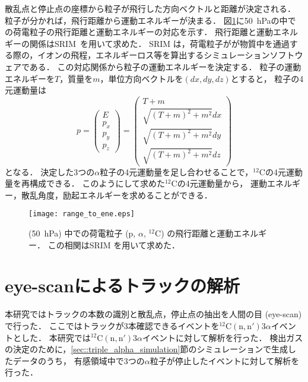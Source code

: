 \documentclass[../master]{subfiles}
\begin{document}
散乱点と停止点の座標から粒子が飛行した方向ベクトルと距離が決定される．
粒子が分かれば，飛行距離から運動エネルギーが決まる．
図\ref{fig::range_to_ene_alpha}に\SI{50}{\hecto\pascal}の\Methane 中での荷電粒子の飛行距離と運動エネルギーの対応を示す．
飛行距離と運動エネルギーの関係はSRIM~\cite{SRIM}を用いて求めた．
SRIM は，荷電粒子がが物質中を通過する際の，イオンの飛程，エネルギーロス等を算出するシミュレーションソフトウェアである．
この対応関係から粒子の運動エネルギーを決定する．
粒子の運動エネルギーを$T$，質量を$m$，単位方向ベクトルを$(dx, dy, dz)$とすると，
粒子の4元運動量は
\begin{equation}
  p =
  \begin{pmatrix}
    E \\ p_{x} \\ p_{y} \\ p_{z}
  \end{pmatrix}
  =
  \begin{pmatrix}
    T + m \\ \sqrt{(T+m)^2 + m^2} dx \\ \sqrt{(T+m)^2 + m^2} dy \\ \sqrt{(T+m)^2 + m^2} dz
  \end{pmatrix}
  \label{eq::momentum_vector}
\end{equation}
となる．
決定した3つの$\alpha$粒子の4元運動量を足し合わせることで，${}^{12}\mathrm{C}$の4元運動量を再構成できる．
このようにして求めた${}^{12}\mathrm{C}$の4元運動量から，
運動エネルギー，散乱角度，励起エネルギーを求めることができる．
\begin{figure}
  \centering
  \texttt{[image: range\_to\_ene.eps]}
  \caption[\Methane (\SI{50}{\hecto\pascal}) 中での荷電粒子 (p, $\alpha$, ${}^{12}\mathrm{C}$) の飛行距離と運動エネルギー．]
          {\Methane (\SI{50}{\hecto\pascal}) 中での荷電粒子 (p, $\alpha$, ${}^{12}\mathrm{C}$) の飛行距離と運動エネルギー．
            この相関はSRIM を用いて求めた．
          }
  \label{fig::range_to_ene_alpha}
\end{figure}


\section{eye-scanによるトラックの解析}
本研究ではトラックの本数の識別と散乱点，停止点の抽出を人間の目 (eye-scan) で行った．
ここではトラックが3本確認できるイベントを${}^{12}\mathrm{C}(\mathrm{n},\mathrm{n}')3\alpha$イベントとした．
本研究では${}^{12}\mathrm{C}(\mathrm{n},\mathrm{n}')3\alpha$イベントに対して解析を行った．
検出ガスの決定のために，\ref{sec::triple_alpha_simulation}節のシミュレーションで生成したデータのうち，
有感領域中で3つの$\alpha$粒子が停止したイベントに対して解析を行った．
\end{document}

